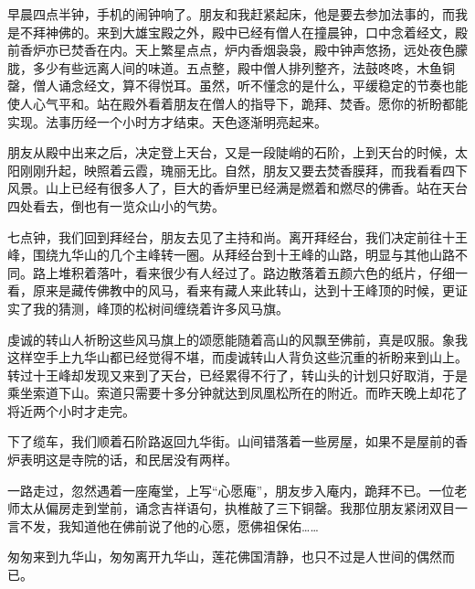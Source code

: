 早晨四点半钟，手机的闹钟响了。朋友和我赶紧起床，他是要去参加法事的，而我是不拜神佛的。来到大雄宝殿之外，殿中已经有僧人在撞晨钟，口中念着经文，殿前香炉亦已焚香在内。天上繁星点点，炉内香烟袅袅，殿中钟声悠扬，远处夜色朦胧，多少有些远离人间的味道。五点整，殿中僧人排列整齐，法鼓咚咚，木鱼铜罄，僧人诵念经文，算不得悦耳。虽然，听不懂念的是什么，平缓稳定的节奏也能使人心气平和。站在殿外看着朋友在僧人的指导下，跪拜、焚香。愿你的祈盼都能实现。法事历经一个小时方才结束。天色逐渐明亮起来。

朋友从殿中出来之后，决定登上天台，又是一段陡峭的石阶，上到天台的时候，太阳刚刚升起，映照着云霞，瑰丽无比。自然，朋友又要去焚香膜拜，而我看看四下风景。山上已经有很多人了，巨大的香炉里已经满是燃着和燃尽的佛香。站在天台四处看去，倒也有一览众山小的气势。

七点钟，我们回到拜经台，朋友去见了主持和尚。离开拜经台，我们决定前往十王峰，围绕九华山的几个主峰转一圈。从拜经台到十王峰的山路，明显与其他山路不同。路上堆积着落叶，看来很少有人经过了。路边散落着五颜六色的纸片，仔细一看，原来是藏传佛教中的风马，看来有藏人来此转山，达到十王峰顶的时候，更证实了我的猜测，峰顶的松树间缠绕着许多风马旗。

虔诚的转山人祈盼这些风马旗上的颂愿能随着高山的风飘至佛前，真是叹服。象我这样空手上九华山都已经觉得不堪，而虔诚转山人背负这些沉重的祈盼来到山上。转过十王峰却发现又来到了天台，已经累得不行了，转山头的计划只好取消，于是乘坐索道下山。索道只需要十多分钟就达到凤凰松所在的附近。而昨天晚上却花了将近两个小时才走完。

下了缆车，我们顺着石阶路返回九华街。山间错落着一些房屋，如果不是屋前的香炉表明这是寺院的话，和民居没有两样。

一路走过，忽然遇着一座庵堂，上写“心愿庵”，朋友步入庵内，跪拜不已。一位老师太从偏房走到堂前，诵念吉祥语句，执椎敲了三下铜罄。我那位朋友紧闭双目一言不发，我知道他在佛前说了他的心愿，愿佛祖保佑……

匆匆来到九华山，匆匆离开九华山，莲花佛国清静，也只不过是人世间的偶然而已。